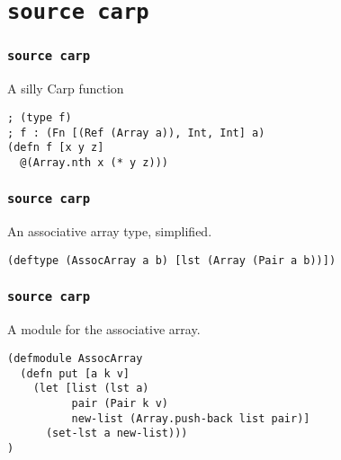\documentclass[aspectratio=169]{beamer}
\begin{document}
  \section{\texttt{source carp}}
  \begin{frame}[fragile]
  \frametitle{\texttt{source carp}}
    \begin{listing}[H]
      \caption{A silly Carp function}
      \begin{verbatim}
; (type f)
; f : (Fn [(Ref (Array a)), Int, Int] a)
(defn f [x y z]
  @(Array.nth x (* y z)))
      \end{verbatim}
    \end{listing}
  \end{frame}
  \begin{frame}[fragile]
    \frametitle{\texttt{source carp}}
    \begin{listing}[H]
      \caption{An associative array type, simplified.}
      \begin{verbatim}
(deftype (AssocArray a b) [lst (Array (Pair a b))])
      \end{verbatim}
    \end{listing}
  \end{frame}
  \begin{frame}[fragile]
    \frametitle{\texttt{source carp}}
    \begin{listing}[H]
      \caption{A module for the associative array.}
      \begin{verbatim}
(defmodule AssocArray
  (defn put [a k v]
    (let [list (lst a)
          pair (Pair k v)
          new-list (Array.push-back list pair)]
      (set-lst a new-list)))
)
      \end{verbatim}
    \end{listing}
  \end{frame}
\end{document}
